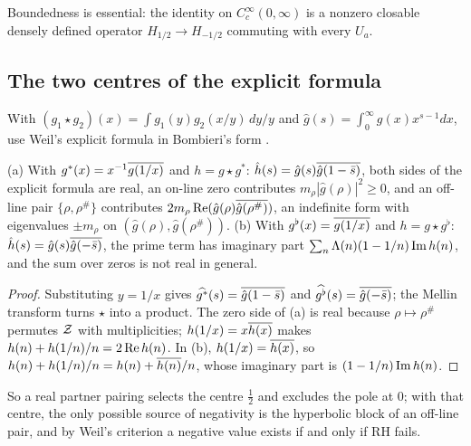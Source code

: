 Boundedness is essential: the identity on $C_c^\infty(0,\infty)$ is a nonzero closable densely defined operator $H_{1/2}\to H_{-1/2}$ commuting with every $U_a$.

\subsection{The two centres of the explicit formula}

With $(g_1\star g_2)(x)=\int g_1(y)g_2(x/y)\,dy/y$ and $\hat g(s)=\int_0^\infty g(x)x^{s-1}dx$, use Weil's explicit formula in Bombieri's form \cite{Bombieri}.

\begin{proposition}\label{prop:centres}
(a) With $g^*(x)=x^{-1}\overline{g(1/x)}$ and $h=g\star g^*$: $\hat h(s)=\hat g(s)\overline{\hat g(1-\bar s)}$, both sides of the explicit formula are real, an on-line zero contributes $m_\rho|\hat g(\rho)|^2\ge0$, and an off-line pair $\{\rho,\rho^\#\}$ contributes $2m_\rho\operatorname{Re}(\hat g(\rho)\overline{\hat g(\rho^\#)})$, an indefinite form with eigenvalues $\pm m_\rho$ on $(\hat g(\rho),\hat g(\rho^\#))$.
(b) With $g^\flat(x)=\overline{g(1/x)}$ and $h=g\star g^\flat$: $\hat h(s)=\hat g(s)\overline{\hat g(-\bar s)}$, the prime term has imaginary part $\sum_n\Lambda(n)(1-1/n)\operatorname{Im} h(n)$, and the sum over zeros is not real in general.
\end{proposition}

\begin{proof}
Substituting $y=1/x$ gives $\widehat{g^*}(s)=\overline{\hat g(1-\bar s)}$ and $\widehat{g^\flat}(s)=\overline{\hat g(-\bar s)}$; the Mellin transform turns $\star$ into a product. The zero side of (a) is real because $\rho\mapsto\rho^\#$ permutes $\mathcal{Z}$ with multiplicities; $h(1/x)=x\overline{h(x)}$ makes $h(n)+h(1/n)/n=2\operatorname{Re} h(n)$. In (b), $h(1/x)=\overline{h(x)}$, so $h(n)+h(1/n)/n=h(n)+\overline{h(n)}/n$, whose imaginary part is $(1-1/n)\operatorname{Im} h(n)$.
\end{proof}

So a real partner pairing selects the centre $\tfrac12$ and excludes the pole at $0$; with that centre, the only possible source of negativity is the hyperbolic block of an off-line pair, and by Weil's criterion \cite{Weil,Bombieri} a negative value exists if and only if RH fails.

